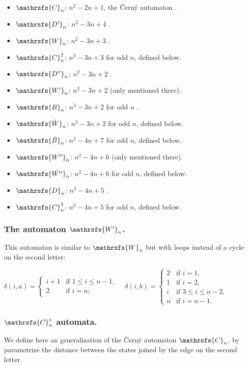 \documentclass[runningheads,a4paper]{llncs}
\newcommand{\<}{\langle}
\renewcommand{\>}{\rangle}
\begin{document}
\begin{itemize}
\item $\mathrsfs{C}_n$: $n^2-2n+1$, the \v{C}ern\'{y} automaton \cite{Ce1964}.
\item $\mathrsfs{D'}_n$: $n^2-3n+4$ \cite{AGV2010}.
\item $\mathrsfs{W}_n$: $n^2-3n+3$ \cite{AGV2010}.
\item $\mathrsfs{C}^2_n$: $n^2-3n+3$ for odd $n$, defined below.
\item $\mathrsfs{D''}_n$: $n^2-3n+2$ \cite{AGV2010}.
\item $\mathrsfs{W'}_n$: $n^2-3n+2$ \cite{AGV2010} (only mentioned there).
\item $\mathrsfs{B}_n$: $n^2-3n+2$ for odd $n$ \cite{AVZ2006,AGV2010}.
\item $\mathrsfs{\dot{W}}_n$: $n^2-3n+2$ for odd $n$, defined below.
\item $\mathrsfs{\dot{B}}_n$: $n^2-4n+7$ for odd $n$, defined below.
\item $\mathrsfs{W''}_n$: $n^2-4n+6$ \cite{AGV2010} (only mentioned there).
\item $\mathrsfs{\dot{W''}}_n$: $n^2-4n+6$ for odd $n$, defined below.
\item $\mathrsfs{D}_n$: $n^2-4n+5$ \cite{AVZ2006}.
\item $\mathrsfs{C}^3_n$: $n^2-4n+5$ for odd $n$, defined below.
\end{itemize}

\subsubsection{The automaton $\mathrsfs{W'}_n$.}
This automaton is similar to $\mathrsfs{W}_n$ but with loops instead of a cycle on the second letter:

$\delta(i,a)=\begin{cases}
i+1 &\text{if } 1 \le i \le n-1,\\
2 &\text{if } i=n;
\end{cases}\quad
\delta(i,b)=\begin{cases}
2 &\text{if } i=1,\\
1 &\text{if } i=2,\\
i &\text{if } 3 \le i \le n-2,\\
n &\text{if } i=n-1.
\end{cases}$

\subsubsection{$\mathrsfs{C}^s_n$ automata.}
We define here an generalization of the \v{C}ern\'{y} automaton $\mathrsfs{C}_n$, by parametrize the distance between the states joined by the edge on the second letter.
\end{document}
